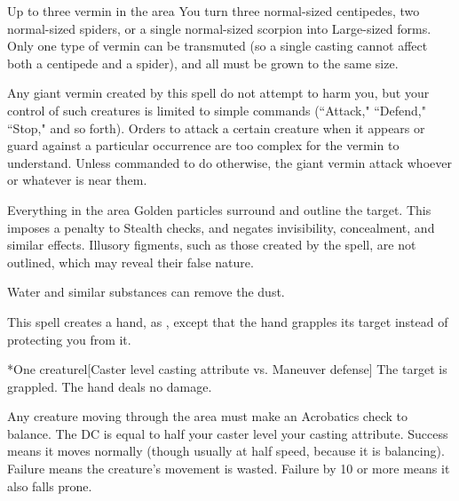 \spelldur{\durmed}
\begin{spelltarget}{Up to three vermin in the area}
    \spelleffect You turn three normal-sized centipedes, two normal-sized spiders, or a single normal-sized scorpion into Large-sized forms. Only one type of vermin can be transmuted (so a single casting cannot affect both a centipede and a spider), and all must be grown to the same size.
    \par Any giant vermin created by this spell do not attempt to harm you, but your control of such creatures is limited to simple commands (``Attack," ``Defend," ``Stop," and so forth). Orders to attack a certain creature when it appears or guard against a particular occurrence are too complex for the vermin to understand. Unless commanded to do otherwise, the giant vermin attack whoever or whatever is near them.
\end{spelltarget}

\spelldur{\durshort}
\begin{spelltarget}{Everything in the area}
    \spelleffect Golden particles surround and outline the target. This imposes a  penalty to Stealth checks, and negates invisibility, concealment, and similar effects. Illusory figments, such as those created by the  spell, are not outlined, which may reveal their false nature.
\end{spelltarget}
\spellnotes Water and similar substances can remove the dust.

\spellrng{\rngmed}
\spelldur{\durshort \dismissable}
\spellline
\spelleffect This spell creates a hand, as , except that the hand grapples its target instead of protecting you from it.
\begin{spelltarget}*{One creature}l[Caster level \add casting attribute vs. Maneuver defense]
    \spellsuccess The target is grappled. The hand deals no damage.
\end{spelltarget}

\spelldur{\durshort \dismissable}
\spellline
\spelleffect Any creature moving through the area must make an Acrobatics check to balance. The DC is equal to half your caster level \add your casting attribute. Success means it moves normally (though usually at half speed, because it is balancing). Failure means the creature's movement is wasted. Failure by 10 or more means it also falls prone.

